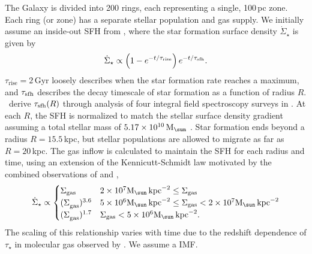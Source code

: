 \documentclass[fleqn,
usenatbib]{mnras}
\newcommand{\JJ}{\citetalias{james+21}}
\newcommand{\Mo}{ {\rm M}_{\sun}}
\begin{document}
The Galaxy is divided into 200 rings, each representing a single, 100\,pc zone. Each ring (or zone) has a separate stellar population and gas supply. We initially assume an inside-out SFH from \JJ, where the star formation surface density $\dot{\Sigma}_\star$ is given by 
\begin{equation}\label{eq:inside_out}
    \dot{\Sigma}_\star \propto \left(1-e^{-t/\tau_{\rm rise}}\right) e^{-t/\tau_{\rm sfh}}.
\end{equation}
$\tau_\text{rise}=2$\,Gyr loosely describes when the star formation rate reaches a maximum, and $\tau_{\rm sfh}$ describes the decay timescale of star formation as a function of radius $R$. \JJ\ derive $\tau_{\rm sfh}(R)$ through analysis of four integral field spectroscopy surveys in \cite{sanches20}. At each $R$, the SFH is normalized to match the stellar surface density gradient \citep{BHG16} assuming a total stellar mass of $5.17\times10^{10}\,\Mo$ \citep{LM15}. Star formation ends beyond a radius $R=15.5\,$kpc, but stellar populations are allowed to migrate as far as $R=20\,$kpc.  
The gas inflow is calculated to maintain the SFH for each radius and time, using an extension of the Kennicutt-Schmidt law \citep{kennicutt98} motivated by the combined observations of \citet{bigiel+10} and \citet{leroy+13}, 
\begin{equation}
\dot{\Sigma}_{\star} \propto 
\begin{cases}
    {\Sigma}_{\rm gas} & 2\times 10^7 \Mo\,{\rm kpc}^{-2} \leq \Sigma_{\rm gas} \\ 
    {(\Sigma}_{\rm gas})^{3.6} & 5\times 10^6 \Mo\,{\rm kpc}^{-2}\leq \Sigma_{\rm gas} < 2\times10^7 \Mo\,{\rm kpc}^{-2}\\ 
    {(\Sigma}_{\rm gas})^{1.7} & \Sigma_{\rm gas} < 5\times10^6 \Mo\,{\rm kpc}^{-2}.
\end{cases}
\end{equation} 
The scaling of this relationship varies with time due to the redshift dependence of $\tau_\star$ in molecular gas observed by \citet{tacconi18}. We assume a \citet{kroupa01} IMF.
\end{document}
